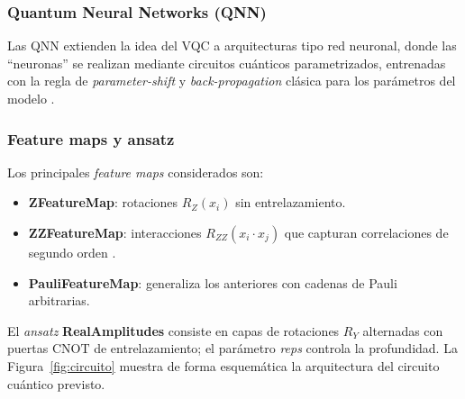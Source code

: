 \documentclass[a4paper,10pt,twocolumn]{article}
\begin{document}
\subsubsection{Quantum Neural Networks (QNN)}
Las QNN extienden la idea del VQC a arquitecturas tipo red neuronal,
donde las ``neuronas'' se realizan mediante circuitos cu\'anticos
parametrizados, entrenadas con la regla de \emph{parameter-shift}
\citep{schuld2019} y \textit{back-propagation} cl\'asica para los
par\'ametros del modelo \citep{yu2025}.

\subsubsection{Feature maps y ansatz}
Los principales \textit{feature maps} considerados son:
\begin{itemize}
    \item \textbf{ZFeatureMap}: rotaciones $R_Z(x_i)$ sin entrelazamiento.
    \item \textbf{ZZFeatureMap}: interacciones $R_{ZZ}(x_i\cdot x_j)$
    que capturan correlaciones de segundo orden \citep{havlicek2019}.
    \item \textbf{PauliFeatureMap}: generaliza los anteriores con cadenas
    de Pauli arbitrarias.
\end{itemize}
El \textit{ansatz} \textbf{RealAmplitudes} consiste en capas de
rotaciones $R_Y$ alternadas con puertas $\mathrm{CNOT}$ de
entrelazamiento; el par\'ametro \textit{reps} controla la profundidad.
La Figura~\ref{fig:circuito} muestra de forma esquem\'atica la
arquitectura del circuito cu\'antico previsto.
\end{document}
